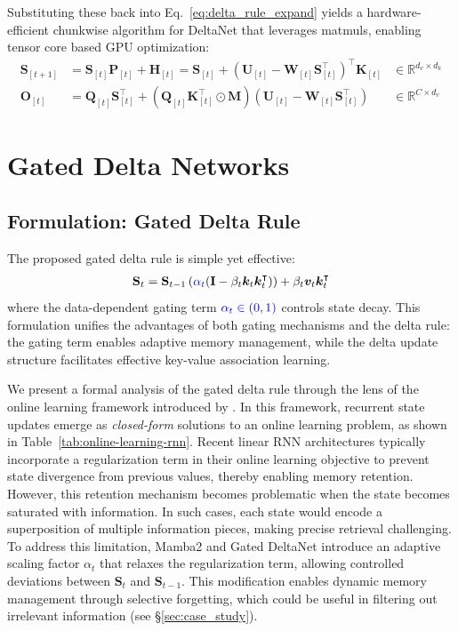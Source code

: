 \documentclass{article}
\def\rmH{{\mathbf{H}}}
\def\rmI{{\mathbf{I}}}
\def\rmK{{\mathbf{K}}}
\def\rmM{{\mathbf{M}}}
\def\rmO{{\mathbf{O}}}
\def\rmP{{\mathbf{P}}}
\def\rmQ{{\mathbf{Q}}}
\def\rmS{{\mathbf{S}}}
\def\rmU{{\mathbf{U}}}
\def\rmW{{\mathbf{W}}}
\def\vk{{\bm{k}}}
\def\vv{{\bm{v}}}
\def\rmU{{\mathbf{U}}}
\def\rmH{{\mathbf{H}}}
\begin{document}
Substituting these back into Eq.~\ref{eq:delta_rule_expand} yields a hardware-efficient chunkwise algorithm for DeltaNet that leverages matmuls, enabling tensor core based GPU optimization:\begin{align}
\rmS_{[t+1]} &= \rmS_{[t]}\rmP_{[t]}+\rmH_{[t]} =  \rmS_{[t]} + \left(\rmU_{[t]} - \rmW_{[t]}\rmS_{[t]}^{\intercal}\right)^\intercal \rmK_{[t]} \label{eq:delta_chunk_h} & \in \mathbb{R}^{d_v \times d_k} \\
    \rmO_{[t]} &= \rmQ_{[t]} \rmS_{[t]}^\intercal + (\rmQ_{[t]} \rmK_{[t]}^{\intercal} \odot \rmM) \left(\rmU_{[t]} - \rmW_{[t]} \rmS_{[t]}^\intercal\right)  &\in \mathbb{R}^{C \times d_v}\label{eq:delta_chunk_o}
\end{align}
\vspace{-5mm}
\section{Gated Delta Networks}
\vspace{-2mm}
\subsection{Formulation: Gated Delta Rule}
\label{sec:online-learning}
The proposed gated delta rule is simple yet effective:
\begin{align}
\rmS_t = \rmS_{t-1} \left( {\color{blue}{\alpha_t}}  (\rmI - \beta_t \vk_t\vk_t^\intercal) \right) + \beta_t \vv_t \vk_t^\intercal
\label{eq:gated_delta_rule}
\end{align}
where the data-dependent gating term $\color{blue}{\alpha_t} \in (0,1)$ controls state decay. This formulation unifies the advantages of both gating mechanisms and the delta rule: the gating term enables adaptive memory management, while the delta update structure facilitates effective key-value association learning. 

We present a formal analysis of the gated delta rule through the lens of the online learning framework introduced by \cite{longhorn}. In this framework, recurrent state updates emerge as \emph{closed-form} solutions to an online learning problem, as shown in Table~\ref{tab:online-learning-rnn}. Recent linear RNN architectures typically incorporate a regularization term in their online learning objective to prevent state divergence from previous values, thereby enabling memory retention.
However, this retention mechanism becomes problematic when the state becomes saturated with information. In such cases, each state would encode a superposition of multiple information pieces, making precise retrieval challenging. To address this limitation, Mamba2 and Gated DeltaNet introduce an adaptive scaling factor $\alpha_t$ that relaxes the regularization term, allowing controlled deviations between $\rmS_t$ and $\rmS_{t-1}$. This modification enables dynamic memory management through selective forgetting, which could be useful in filtering out irrelevant information (see \S \ref{sec:case_study}).
\end{document}
